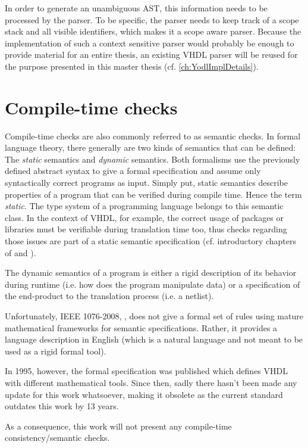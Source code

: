 In order to generate an
unambiguous AST, this information needs to be processed by the
parser. To be specific, the parser needs to keep track of a scope
stack and all visible identifiers, which makes it a scope aware
parser. Because the implementation of such a context sensitive parser
would probably be enough to provide material for an entire
thesis, an existing VHDL parser will be reused for the purpose
presented in this master thesis (cf. \ref{ch:YodlImplDetails}).

\section{Compile-time checks}
\label{sec:Compile-time checks}

Compile-time checks are also commonly referred to as semantic
checks. In formal language theory, there generally are two kinds of
semantics that can be defined: The \emph{static} semantics and
\emph{dynamic} semantics. Both formalisms use the previously defined
abstract syntax to give a formal specification and assume only
syntactically correct programs as input.
Simply put, static semantics describe properties of a program that can
be verified during compile time. Hence the term \emph{static}. The
type system of a programming language belongs to this semantic
class. In the context of VHDL, for example, the correct usage of
packages or libraries must be verifiable during translation time too,
thus checks regarding those issues are part of a static semantic
specification (cf. introductory chapters of \cite{FERN2014} and
\cite{SCH97}).

The dynamic semantics of a program is either a rigid description of
its behavior during runtime (i.e. how does the program manipulate
data) or a specification of the end-product to the translation process
(i.e. a netlist).

Unfortunately, IEEE 1076-2008, \cite{IEEELRM},
does not give a formal set of rules using mature mathematical
frameworks for semantic specifications. Rather, it provides
a language description in English (which is a natural language and not
meant to be used as a rigid formal tool).

In 1995, however, the formal specification \cite{VHDLFORM}
was published which defines VHDL with different mathematical
tools. Since then, sadly there hasn't been made any update for this
work whatsoever, making it obsolete as the current standard outdates
this work by 13 years.

As a consequence, this work will not present any compile-time
consistency/semantic checks.

